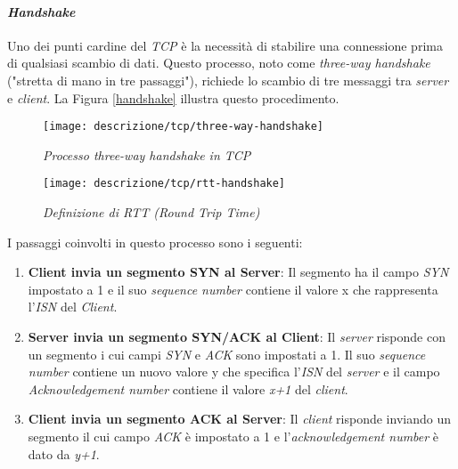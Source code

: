 \paragraph{\textit{Handshake}}

\noindent Uno dei punti cardine del \emph{TCP} è la necessità di stabilire una connessione prima di qualsiasi scambio di dati. Questo processo, noto come \emph{three-way handshake} ("stretta di mano in tre passaggi"), richiede lo scambio di tre messaggi tra \emph{server} e \emph{client}. La Figura \ref{handshake} illustra questo procedimento.

\begin{figure}[!h]
    \centering
    \begin{minipage}{0.48\textwidth}
        \centering
        \texttt{[image: descrizione/tcp/three-way-handshake]}
        \caption{\emph{Processo three-way handshake in TCP}}
        \label{handshake}
    \end{minipage}
    \hfill
    \begin{minipage}{0.48\textwidth}
        \centering
        \texttt{[image: descrizione/tcp/rtt-handshake]}
        \caption{\emph{Definizione di RTT (Round Trip Time)}}
        \label{rtt}
    \end{minipage}
\end{figure}

\noindent I passaggi coinvolti in questo processo sono i seguenti: 

\begin{enumerate}
    \item \textbf{Client invia un segmento SYN al Server}: Il segmento ha il campo \emph{SYN} impostato a 1 e il suo \emph{sequence number} contiene il valore x che rappresenta l'\emph{ISN} del \emph{Client}.
    \item \textbf{Server invia un segmento SYN/ACK al Client}: Il \emph{server} risponde con un segmento i cui campi \emph{SYN} e \emph{ACK} sono impostati a 1. Il suo \emph{sequence number} contiene un nuovo valore y che specifica l'\emph{ISN} del \emph{server} e il campo \emph{Acknowledgement number} contiene il valore \emph{x+1} del \emph{client}.
    \item \textbf{Client invia un segmento ACK al Server}: Il \emph{client} risponde inviando un segmento il cui campo \emph{ACK} è impostato a 1 e l'\emph{acknowledgement number} è dato da \emph{y+1}.
\end{enumerate}


